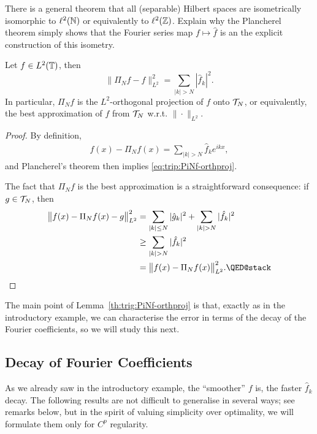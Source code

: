 \begin{exercise}
  There is a general theorem that all (separable) Hilbert spaces are
  isometrically isomorphic to $\ell^2(\mathbb{N})$ or equivalently to $\ell^2(\mathbb{Z})$.
  Explain why the Plancherel theorem simply shows that the Fourier series map
  $f \mapsto \hat{f}$ is an the explicit construction of this isometry.
\end{exercise}


\begin{proposition} \label{th:trig:PiNf-orthproj}
  Let $f \in L^2(\mathbb{T})$, then
  \begin{equation} \label{eq:trip:PiNf-orthproj}
    \| \Pi_N f - f \|_{L^2}^2 = \sum_{|k| > N} |\hat{f}_k|^2.
  \end{equation}
  In particular, $\Pi_N f$ is the $L^2$-orthogonal
  projection of $f$ onto $\mathcal{T}_N$, or equivalently, the
  best approximation of $f$ from $\mathcal{T}_N$ w.r.t. $\|\cdot\|_{L^2}$.
\end{proposition}
\begin{proof}
  By definition,
  \begin{align*}
    f(x) - \Pi_N f(x) = \sum_{|k|>N} \hat{f}_k e^{ikx},
  \end{align*}
  and Plancherel's theorem then implies \eqref{eq:trip:PiNf-orthproj}.

  The fact that $\Pi_N f$ is the best approximation is a straightforward
  consequence: if $g \in \mathcal{T}_N$, then
  \begin{align*}
    \b\|f(x) - \Pi_N f(x) - g\b\|_{L^2}^2
    &= \sum_{|k| \leq N} |\hat{g}_k|^2 + \sum_{|k| > N} |\hat{f}_k|^2 \\
    &\geq \sum_{|k| > N} |\hat{f}_k|^2 \\
    &= \b\|f(x) - \Pi_N f(x) \b\|_{L^2}^2. \qedhere
  \end{align*}
\end{proof}

The main point of Lemma~\ref{th:trig:PiNf-orthproj} is that, exactly as in the
introductory example, we can characterise the error in terms of the
decay of the Fourier coefficients, so we will study this next. 


\subsection{Decay of Fourier Coefficients}
%
\label{sec:trig:decay}
%
As we already saw in the introductory example, the ``smoother'' $f$ is, the
faster $\hat{f}_k$ decay. The following results are not difficult to generalise
in several ways; see remarks below, but in the spirit of valuing simplicity over
optimality, we will formulate them only for $C^p$ regularity.

